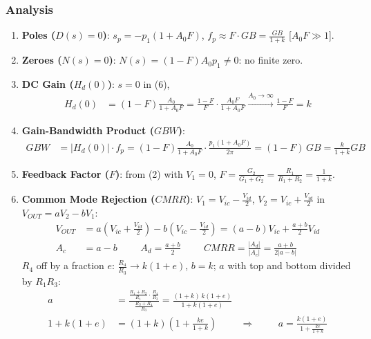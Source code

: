 \subsubsection{Analysis}
\begin{enumerate}
  \item \textbf{Poles (\(D(s) = 0\))}: \(s_p = -p_1(1 + A_0 F)\), \(f_p \approx F \cdot GB = \frac{GB}{1 + k}\) [\(A_0 F \gg 1\)].
  \item \textbf{Zeroes (\(N(s) = 0\))}: \(N(s) = (1 - F) A_0 p_1 \neq 0\): no finite zero.
  \item \textbf{DC Gain (\(H_d(0)\))}: \(s = 0\) in (6),
    \begin{align*}
      H_d(0) &= (1 - F)\frac{A_0}{1 + A_0 F} = \frac{1 - F}{F}\cdot\frac{A_0 F}{1 + A_0 F} \xrightarrow{A_0 \to \infty} \frac{1 - F}{F} = k
    \end{align*}
  \item \textbf{Gain-Bandwidth Product (\(GBW\))}:
    \begin{align*}
      GBW &= |H_d(0)| \cdot f_p = (1 - F)\frac{A_0}{1 + A_0 F}\cdot\frac{p_1(1 + A_0 F)}{2\pi} = (1 - F)\, GB = \frac{k}{1 + k} GB
    \end{align*}
  \item \textbf{Feedback Factor (\(F\))}: from (2) with \(V_1 = 0\),
    \(F = \frac{G_2}{G_1 + G_2} = \frac{R_1}{R_1 + R_2} = \frac{1}{1 + k}\).
  \item \textbf{Common Mode Rejection (\(CMRR\))}: \(V_1 = V_{ic} - \frac{V_{id}}{2}\),
    \(V_2 = V_{ic} + \frac{V_{id}}{2}\) in \(V_{OUT} = a V_2 - b V_1\):
    \begin{align*}
      V_{OUT} &= a\left(V_{ic} + \frac{V_{id}}{2}\right) - b\left(V_{ic} - \frac{V_{id}}{2}\right)
               = (a - b) V_{ic} + \frac{a + b}{2} V_{id} \\
      A_c &= a - b \hspace{1cm} A_d = \frac{a + b}{2} \hspace{1cm}
      CMRR = \frac{|A_d|}{|A_c|} = \frac{a + b}{2|a - b|}
    \end{align*}
    \(R_4\) off by a fraction \(e\): \(\frac{R_4}{R_3} \to k(1 + e)\), \(b = k\);
    \(a\) with top and bottom divided by \(R_1 R_3\):
    \begin{align*}
      a &= \frac{\frac{R_1 + R_2}{R_1}\cdot\frac{R_4}{R_3}}{\frac{R_3 + R_4}{R_3}} = \frac{(1 + k)\, k(1 + e)}{1 + k(1 + e)} \\
      1 + k(1 + e) &= (1 + k)\left(1 + \frac{ke}{1 + k}\right) \hspace{1cm} \Rightarrow \hspace{1cm} a = \frac{k(1 + e)}{1 + \frac{ke}{1 + k}} \\

\end{align*}
\end{enumerate}
